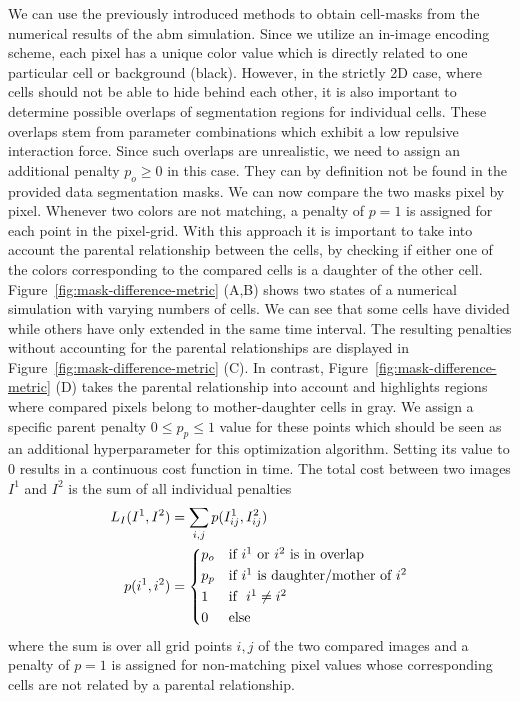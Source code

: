 We can use the previously introduced  methods to
obtain cell-masks
from the numerical results of the \ac{abm} simulation.
Since we utilize an in-image encoding scheme, each pixel has a unique color value
which is directly
related to one particular cell or background (black).
However, in the strictly 2D case, where cells should not be able to hide behind each
other, it is
also important to determine possible overlaps of segmentation regions for individual cells.
These overlaps stem from parameter combinations which exhibit a low repulsive interaction force.
Since such overlaps are unrealistic, we need to assign an additional penalty
$p_o\geq0$ in this case.
They can by definition not be found in the provided data segmentation masks.
We can now compare the two masks pixel by pixel.
Whenever two colors are not matching, a penalty of $p=1$ is assigned for each point in the
pixel-grid.
With this approach it is important to take into account the parental relationship
between the cells,
by checking if either one of the colors corresponding to the compared cells is a daughter of the
other cell.
Figure~\ref{fig:mask-difference-metric} (A,B) shows two states of a numerical simulation
with varying numbers of cells.
We can see that some cells have divided while others have only extended in the same
time interval.
The resulting penalties without accounting for the parental relationships are displayed in
Figure~\ref{fig:mask-difference-metric} (C).
In contrast, Figure~\ref{fig:mask-difference-metric} (D) takes the parental relationship into
account and highlights regions where compared pixels belong to mother-daughter cells in gray.
We assign a specific parent penalty $0\leq p_p\leq 1$ value for these points which
should be seen as
an additional hyperparameter for this optimization algorithm.
Setting its value to $0$ results in a continuous cost function in time.
The total cost between two images $I^1$ and $I^2$ is the sum of all individual penalties
\begin{align*}
    L_I(I^1,I^2) &= \sum\limits_{i,j} p(I^1_{ij}, I^2_{ij})\\
    p(i^1,i^2) &=
    \begin{cases*}
        p_o & \text{if $i^1$ or $i^2$ is in overlap}\\
        p_p & \text{if $i^1$ is daughter/mother of $i^2$}\\
        1 & \text{if } $i^1\neq i^2$\\
        0 & \text{else}
    \end{cases*}
\end{align*}
where the sum is over all grid points $i,j$ of the two compared images and a penalty of $p=1$ is
assigned for non-matching pixel values whose corresponding cells are not related by a parental
relationship.

